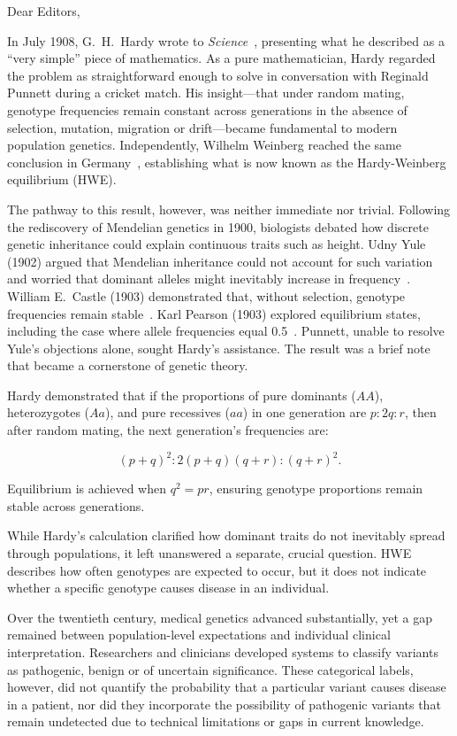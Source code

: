 \documentclass[12pt,a4paper]{letter}
\begin{document}
\begin{letter}{Dear Editors,}

\opening{}

In July 1908, G.~H.~Hardy wrote to \textit{Science}~\cite{hardy1908}, presenting what he described as a “very simple” piece of mathematics. As a pure mathematician, Hardy regarded the problem as straightforward enough to solve in conversation with Reginald Punnett during a cricket match. His insight—that under random mating, genotype frequencies remain constant across generations in the absence of selection, mutation, migration or drift—became fundamental to modern population genetics. Independently, Wilhelm Weinberg reached the same conclusion in Germany~\cite{weinberg1908}, establishing what is now known as the Hardy-Weinberg equilibrium (HWE).

The pathway to this result, however, was neither immediate nor trivial. Following the rediscovery of Mendelian genetics in 1900, biologists debated how discrete genetic inheritance could explain continuous traits such as height. Udny Yule (1902) argued that Mendelian inheritance could not account for such variation and worried that dominant alleles might inevitably increase in frequency~\cite{yule1902}. William E.~Castle (1903) demonstrated that, without selection, genotype frequencies remain stable~\cite{castle1903}. Karl Pearson (1903) explored equilibrium states, including the case where allele frequencies equal 0.5~\cite{pearson1903}. Punnett, unable to resolve Yule’s objections alone, sought Hardy’s assistance. The result was a brief note that became a cornerstone of genetic theory.

Hardy demonstrated that if the proportions of pure dominants ($AA$), heterozygotes ($Aa$), and pure recessives ($aa$) in one generation are $p : 2q : r$, then after random mating, the next generation’s frequencies are:

\[
(p+q)^2 : 2(p+q)(q+r) : (q+r)^2.
\]

Equilibrium is achieved when \( q^2 = pr \), ensuring genotype proportions remain stable across generations.

While Hardy’s calculation clarified how dominant traits do not inevitably spread through populations, it left unanswered a separate, crucial question. HWE describes how often genotypes are expected to occur, but it does not indicate whether a specific genotype causes disease in an individual.

Over the twentieth century, medical genetics advanced substantially, yet a gap remained between population-level expectations and individual clinical interpretation. Researchers and clinicians developed systems to classify variants as pathogenic, benign or of uncertain significance. These categorical labels, however, did not quantify the probability that a particular variant causes disease in a patient, nor did they incorporate the possibility of pathogenic variants that remain undetected due to technical limitations or gaps in current knowledge.


\end{letter}
\end{document}
